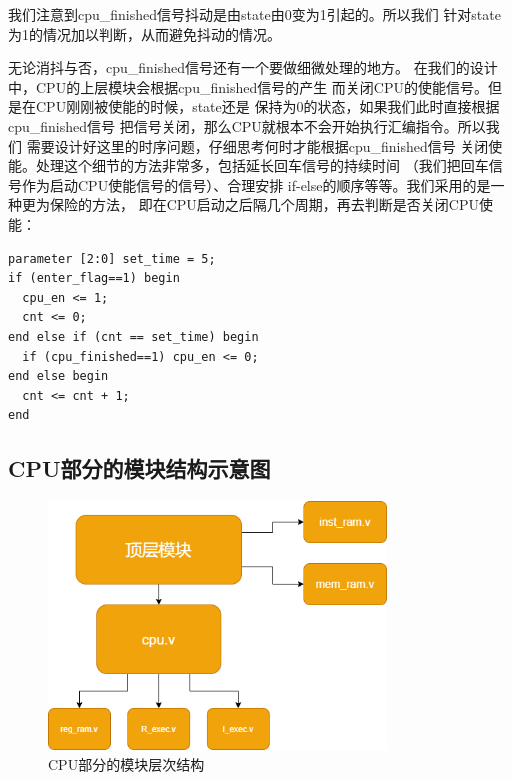\documentclass[12pt,a4paper,UTF8]{article}
\begin{document}
我们注意到cpu\_finished信号抖动是由state由0变为1引起的。所以我们
针对state为1的情况加以判断，从而避免抖动的情况。

无论消抖与否，cpu\_finished信号还有一个要做细微处理的地方。
在我们的设计中，CPU的上层模块会根据cpu\_finished信号的产生
而关闭CPU的使能信号。但是在CPU刚刚被使能的时候，state还是
保持为0的状态，如果我们此时直接根据cpu\_finished信号
把信号关闭，那么CPU就根本不会开始执行汇编指令。所以我们
需要设计好这里的时序问题，仔细思考何时才能根据cpu\_finished信号
关闭使能。处理这个细节的方法非常多，包括延长回车信号的持续时间
（我们把回车信号作为启动CPU使能信号的信号）、合理安排
if-else的顺序等等。我们采用的是一种更为保险的方法，
即在CPU启动之后隔几个周期，再去判断是否关闭CPU使能：
\begin{lstlisting}[style=verilog-style]
parameter [2:0] set_time = 5;
if (enter_flag==1) begin
  cpu_en <= 1;
  cnt <= 0;
end else if (cnt == set_time) begin
  if (cpu_finished==1) cpu_en <= 0;
end else begin
  cnt <= cnt + 1;
end
\end{lstlisting}


\subsection{CPU部分的模块结构示意图}
\begin{figure}[H]
  \centering
  \includegraphics[width=0.8\textwidth]{cpu_struct.png}
  \caption{CPU部分的模块层次结构}
  \label{cpu_struct}
\end{figure}
\end{document}
